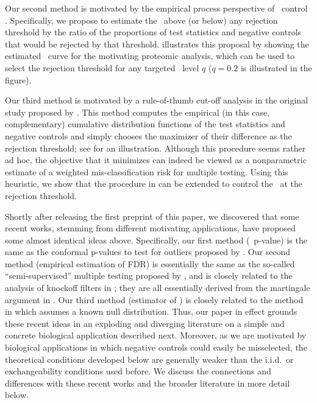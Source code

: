 \documentclass[a4paper,11pt]{article}
\theoremstyle{plain}
\theoremstyle{definition}
\theoremstyle{plain}
\newcommand{\nickname}{{\text{RANC}}}
\newcommand{\FDR}{\text{FDR}}
\newcommand{\localFDR}{\text{local-FDR}}
\begin{document}
Our second method is motivated by the empirical process perspective of
\FDR\ control
\parencite{genovese2004stochastic,storey2004strong}. Specifically, we
propose to estimate the \FDR\ above (or below) any rejection threshold
by the ratio of the proportions of test statistics and
negative controls that would be rejected by that
threshold.  illustrates this proposal by
showing the estimated \FDR\ curve for the motivating proteomic
analysis, which can be used to select the rejection threshold for any
targeted \FDR\ level $q$ ($q = 0.2$ is illustrated in the figure).

Our third method is motivated by a rule-of-thumb cut-off analysis in the
original study \parencite{shuster2022situ} proposed by
\textcite{hung14_proteom_mappin_human_mitoc_inter}. This method
computes the empirical (in this case, complementary) cumulative
distribution functions of the test statistics and negative controls
and simply chooses the maximizer of their difference as the rejection
threshold; see  for an illustration. Although this
procedure seems rather ad hoc, the objective that it minimizes can indeed
be viewed as a nonparametric estimate of a weighted mis-classification
risk for multiple testing. Using this heuristic, we show that the
procedure in \textcite{hung14_proteom_mappin_human_mitoc_inter} can be
extended to control the \localFDR~at the rejection threshold.

Shortly after releasing the first preprint of this paper, we
discovered that some recent works, stemming from different motivating
applications, have proposed some almost identical ideas
above. Specifically, our first method (\nickname\ p-value) is the same
as the conformal p-values to test for outliers proposed by
\textcite{bates21_testin_outlier_with_confor_p_values}. Our
second method (empirical estimation of FDR) is essentially the same as
the so-called ``semi-supervised'' multiple testing proposed by
\textcite{mary22_semi_super_multip_testin}, and is closely related to
the analysis of knockoff filters in
\textcite{weinstein17_power_predic_analy_knock_with_lasso_statis};
they are all essentially derived from the martingale argument in
\textcite{storey2004strong}. Our
third method (estimator of \localFDR) is closely related to the method in
\textcite{soloff22_edge_discov} which assumes a known null
distribution. Thus, our paper in effect grounds these recent
ideas in an exploding and diverging literature on a simple and
concrete biological application described next. Moreover, as we are
motivated by biological applications in which negative controls could
easily be misselected, the theoretical
conditions developed below are generally weaker than the i.i.d.\ or
exchangeability conditions used before. We discuss the
connections and differences with these recent works and the broader
literature in more detail below.
\end{document}
